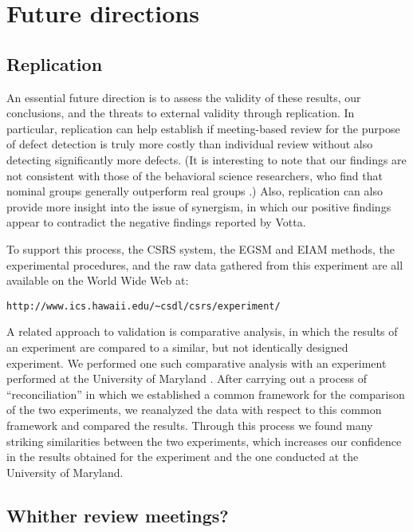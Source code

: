 \section{Future directions}

\subsection{Replication}
\label{sec:replication}

An essential future direction is to assess the validity of these results,
our conclusions, and the threats to external validity through replication.
In particular, replication can help establish if meeting-based review for
the purpose of defect detection is truly more costly than individual review
without also detecting significantly more defects. (It is interesting to
note that our findings are not consistent with those of the behavioral
science researchers, who find that nominal groups generally outperform real
groups \cite{Diehl87,Mullen91}.) Also, replication can also provide more
insight into the issue of synergism, in which our positive findings appear
to contradict the negative findings reported by Votta.

To support this process, the CSRS system, the EGSM and EIAM methods, 
the experimental procedures, and the raw data gathered from
this experiment are all available on the World Wide Web at:

\small
\begin{verbatim}
http://www.ics.hawaii.edu/~csdl/csrs/experiment/
\end{verbatim}
\normalsize

A related approach to validation is comparative analysis, in which the
results of an experiment are compared to a similar, but not identically
designed experiment.  We performed one such comparative analysis
with an experiment performed at the University of Maryland
\cite{Porter97}.  After carrying out a process of ``reconciliation'' in
  which we established a common framework for the comparison of the two
  experiments, we reanalyzed the data with respect to this common framework
  and compared the results.  Through this process we found many striking
  similarities between the two experiments, which increases our confidence
  in the results obtained for the experiment and the one conducted at the
  University of Maryland.

\subsection{Whither review meetings?}

